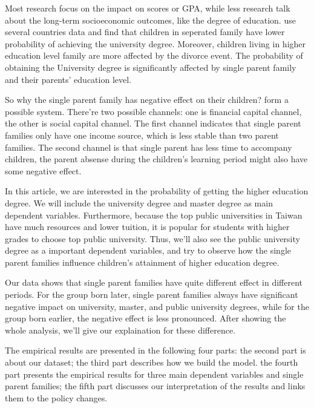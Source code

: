 \documentclass[]{AEA}
\begin{document}
    Most research focus on the impact on scores or GPA, while less research talk about the long-term socioeconomic outcomes, like the degree of education. \cite{bernardi2014} use several countries data and find that children in seperated family have lower probability of achieving the university degree. Moreover, children living in higher education level family are more affected by the divorce event. The probability of obtaining the University degree is significantly affected by single parent family and their parents' education level.

    So why the single parent family has negative effect on their children? \cite{pong2003} form a possible system. There're two possible channels: one is financial capital channel, the other is social capital channel. The first channel indicates that single parent families only have one income source, which is less stable than two parent families. The second channel is that single parent has less time to accompany children, the parent absense during the children's learning period might also have some negative effect.

    In this article, we are interested in the probability of getting the higher education degree. We will include the university degree and master degree as main dependent variables. Furthermore, because the top public universities in Taiwan have much resources and lower tuition, it is popular for students with higher grades to choose top public university.\citep{luoh2018} Thus, we'll also see the public university degree as a important dependent variables, and try to observe how the single parent families influence children's attainment of higher education degree.

    Our data shows that single parent families have quite different effect in different periods. For the group born later, single parent families always have significant negative impact on university, master, and public university degrees, while for the group born earlier, the negative effect is less pronounced. After showing the whole analysis, we'll give our explaination for these difference.

    The empirical results are presented in the following four parts: the second part is about our dataset; the third part describes how we build the model. the fourth part presents the empirical results for three main dependent variables and single parent families; the fifth part discusses our interpretation of the results and links them to the policy changes.
    
\end{document}
